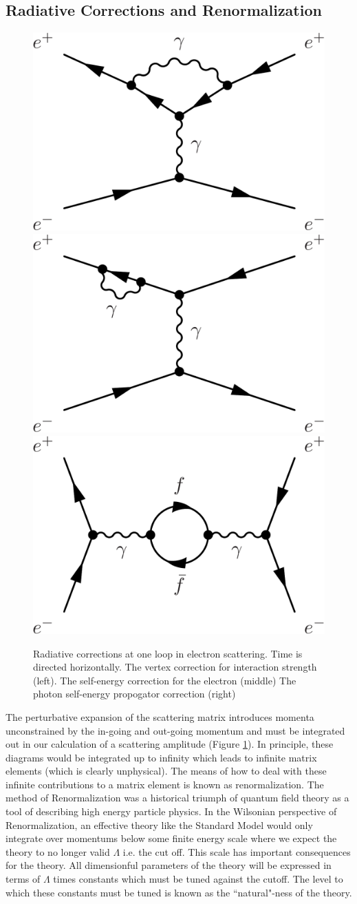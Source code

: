 \subsection{Radiative Corrections and Renormalization} 

\begin{figure}
\begin{center}
\includegraphics[width=.3\textwidth]{pics/vertex_correction}
\includegraphics[width=.3\textwidth]{pics/self_energy}
\includegraphics[width=.3\textwidth]{pics/mass_correction}
\end{center}
\caption{Radiative corrections at one loop in electron scattering. Time is directed horizontally. The vertex correction for interaction strength (left). The self-energy correction for the electron (middle)  
The photon self-energy propogator correction (right) }
\label{fig:one_loop}
\end{figure}

The perturbative expansion of the scattering matrix introduces momenta unconstrained by the in-going and out-going momentum and must be integrated out in our calculation of a scattering amplitude (Figure \ref{fig:one_loop}). In principle, these diagrams would be integrated up to infinity which leads to infinite matrix elements (which is clearly unphysical). The
means of how to deal with these infinite contributions to a matrix element is known as renormalization. The method of 
Renormalization was a historical triumph of quantum field theory as a tool of describing high energy particle physics.
 In the Wilsonian perspective of Renormalization, an effective theory like the Standard Model would only integrate
 over momentums below some finite energy scale where
 we expect the theory to no longer valid $\Lambda$ i.e. the cut off. This
 scale has important consequences for the theory. All dimensionful parameters of the theory will be expressed in terms of $\Lambda$ times constants which must be tuned against the cutoff. The level to which these constants must
 be tuned is known as the ``natural"-ness of the theory. 

